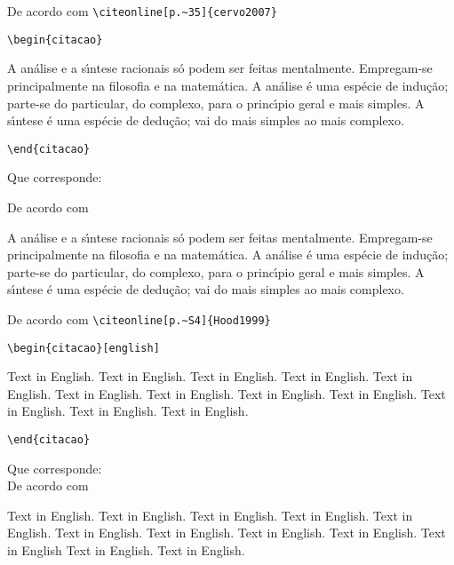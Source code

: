 \begin{alineas} 

\item 
De acordo com \verb+\citeonline[p.~35]{cervo2007}+

\verb+\begin{citacao}+

A an\'alise e a s\'{\i}ntese racionais s\'o podem ser feitas mentalmente. Empregam-se principalmente na filosofia e na matem\'atica. A an\'alise \'e uma esp\'ecie de indu\c{c}\~ao; parte-se do particular, do complexo, para o princ\'{\i}pio geral e mais simples. A s\'{\i}ntese \'e uma esp\'ecie de dedu\c{c}\~ao; vai do mais simples ao mais complexo.

\verb+\end{citacao}+

Que corresponde: 

De acordo com 

\begin{citacao}
A an\'alise e a s\'{\i}ntese racionais s\'o podem ser feitas mentalmente. Empregam-se principalmente na filosofia e na matem\'atica. A an\'alise \'e uma esp\'ecie de indu\c{c}\~ao; parte-se do particular, do complexo, para o princ\'{\i}pio geral e mais simples. A s\'{\i}ntese \'e uma esp\'ecie de dedu\c{c}\~ao; vai do mais simples ao mais complexo.
\end{citacao}

\item
De acordo com \verb+\citeonline[p.~S4]{Hood1999}+

\verb+\begin{citacao}[english]+

Text in English. Text in English. Text in English. Text in
English. Text in English. Text in English. Text in English. 
Text in English. Text in English. Text in English. Text in
English. Text in English.

\verb+\end{citacao}+

Que corresponde: \\

 De acordo com 
\begin{citacao}[english]
	Text in English. Text in English. Text in English. Text in English. Text in English. Text in English. Text in English. Text in English. Text in English. Text in English Text in English. Text in English.
\end{citacao}

\end{alineas}

